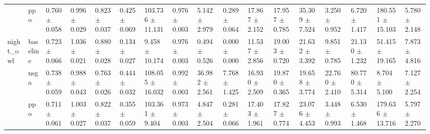 \begin{table}[htbp]
\begin{tabular}{lllllllllllllllll}
 & ppo & 0.760 $\pm$ 0.058 & 0.996 $\pm$ 0.029 & 0.823 $\pm$ 0.037 & 0.425 $\pm$ 0.069 & 103.736 $\pm$ 11.131 & 0.976 $\pm$ 0.003 & 5.142 $\pm$ 2.979 & 0.289 $\pm$ 0.064 & 17.867 $\pm$ 2.152 & 17.957 $\pm$ 0.785 & 35.309 $\pm$ 7.524 & 3.250 $\pm$ 0.952 & 6.720 $\pm$ 1.417 & 180.551 $\pm$ 15.103 & 5.780 $\pm$ 2.148 \\
\cline{1-17}
\multirow[t]{3}{*}{night_owl} & baseline & 0.723 $\pm$ 0.066 & 1.036 $\pm$ 0.021 & 0.880 $\pm$ 0.028 & 0.134 $\pm$ 0.027 & 9.458 $\pm$ 10.174 & 0.976 $\pm$ 0.003 & 0.494 $\pm$ 0.526 & 0.000 $\pm$ 0.000 & 11.537 $\pm$ 2.856 & 19.003 $\pm$ 0.720 & 21.632 $\pm$ 3.392 & 9.851 $\pm$ 0.785 & 21.130 $\pm$ 1.232 & 51.415 $\pm$ 19.165 & 7.873 $\pm$ 4.816 \\
 & nsga & 0.738 $\pm$ 0.059 & 0.988 $\pm$ 0.043 & 0.763 $\pm$ 0.026 & 0.444 $\pm$ 0.032 & 108.055 $\pm$ 16.032 & 0.992 $\pm$ 0.003 & 36.982 $\pm$ 2.561 & 7.768 $\pm$ 1.425 & 16.930 $\pm$ 2.509 & 19.870 $\pm$ 0.365 & 19.658 $\pm$ 3.774 & 22.760 $\pm$ 2.410 & 80.770 $\pm$ 5.314 & 8.704 $\pm$ 5.100 & 7.127 $\pm$ 2.254 \\
 & ppo & 0.711 $\pm$ 0.061 & 1.003 $\pm$ 0.027 & 0.822 $\pm$ 0.037 & 0.355 $\pm$ 0.059 & 103.361 $\pm$ 9.404 & 0.973 $\pm$ 0.003 & 4.847 $\pm$ 2.504 & 0.281 $\pm$ 0.066 & 17.403 $\pm$ 1.961 & 17.827 $\pm$ 0.774 & 23.076 $\pm$ 4.453 & 3.448 $\pm$ 0.993 & 6.530 $\pm$ 1.468 & 179.636 $\pm$ 13.716 & 5.797 $\pm$ 2.270 \\
\cline{1-17}
\bottomrule
\end{tabular}
\end{table}


